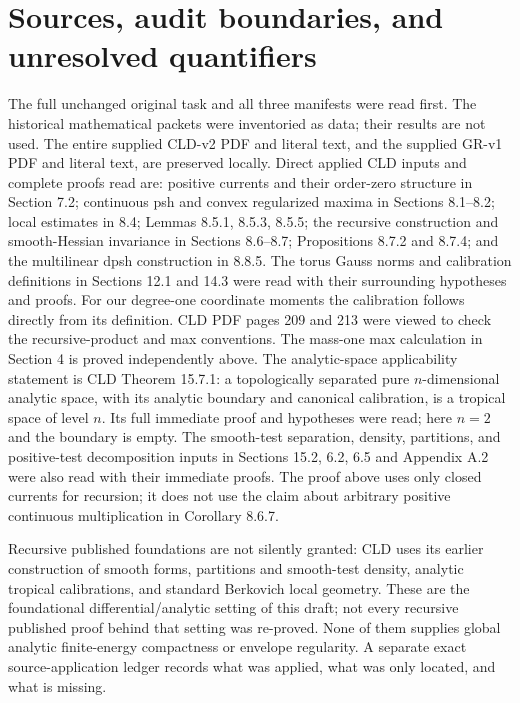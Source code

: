 \documentclass[11pt]{article}
\theoremstyle{definition}\newtheorem{definition}[theorem]{Definition}
\begin{document}
\section{Sources, audit boundaries, and unresolved quantifiers}
The full unchanged original task and all three manifests were read first.
The historical mathematical packets were inventoried as data; their results
are not used. The entire supplied CLD-v2 PDF and literal text, and the
supplied GR-v1 PDF and literal text, are preserved locally. Direct applied
CLD inputs and complete proofs read are: positive currents and their
order-zero structure in Section 7.2; continuous psh and convex regularized
maxima in Sections 8.1--8.2; local estimates in 8.4; Lemmas 8.5.1,
8.5.3, 8.5.5; the recursive construction and smooth-Hessian invariance
in Sections 8.6--8.7; Propositions 8.7.2 and 8.7.4; and the
multilinear dpsh construction in 8.8.5. The torus Gauss norms and
calibration definitions in Sections 12.1 and 14.3 were read with their
surrounding hypotheses and proofs. For our degree-one coordinate moments
the calibration follows directly from its definition. CLD PDF pages 209
and 213 were viewed to check the recursive-product and max conventions.
The mass-one max calculation in Section 4 is proved independently above.
The analytic-space applicability statement is CLD Theorem 15.7.1:
a topologically separated pure $n$-dimensional analytic space, with its
analytic boundary and canonical calibration, is a tropical space of level
$n$. Its full immediate proof and hypotheses were read; here $n=2$ and
the boundary is empty. The smooth-test separation, density, partitions,
and positive-test decomposition inputs in Sections 15.2, 6.2, 6.5 and
Appendix A.2 were also read with their immediate proofs. The proof above
uses only closed currents for recursion; it does not use the claim about
arbitrary positive continuous multiplication in Corollary 8.6.7.

Recursive published foundations are not silently granted: CLD uses its
earlier construction of smooth forms, partitions and smooth-test density,
analytic tropical calibrations, and standard Berkovich local geometry.
These are the foundational differential/analytic setting of this draft;
not every recursive published proof behind that setting was re-proved.
None of them supplies global analytic finite-energy compactness or
envelope regularity. A separate exact source-application ledger records
what was applied, what was only located, and what is missing.
\end{document}
